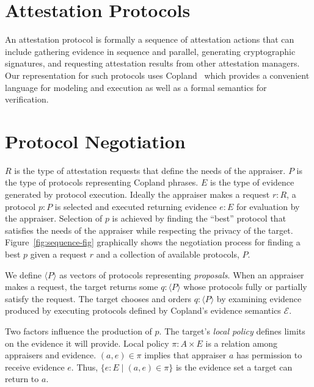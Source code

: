 \documentclass[sigconf,authordraft]{acmart}
\begin{document}
\section{Attestation Protocols}

An attestation protocol is formally a sequence of attestation actions
that can include gathering evidence in sequence and parallel,
generating cryptographic signatures, and requesting attestation
results from other attestation managers.  Our representation for such
protocols uses Copland~\citep{Ramsdell:2019aa} which provides a
convenient language for modeling and execution as well as a formal
semantics for verification.


\section{Protocol Negotiation}

$R$ is the type of attestation requests that define the needs of the
appraiser.  $P$ is the type of protocols representing Copland phrases.
$E$ is the type of evidence generated by protocol execution.  Ideally
the appraiser makes a request $r:R$, a protocol $p:P$ is selected and
executed returning evidence $e:E$ for evaluation by the appraiser.
Selection of $p$ is achieved by finding the ``best'' protocol that
satisfies the needs of the appraiser while respecting the privacy of
the target.  Figure~\ref{fig:sequence-fig} graphically shows the
negotiation process for finding a best $p$ given a request $r$ and a
collection of available protocols, $P$.

We define $\langle P \rangle$ as vectors of protocols
representing \emph{proposals}.  When an appraiser makes a request,
the target returns some $q:\langle P \rangle$ whose protocols fully or
partially satisfy the request. The target chooses and orders
$q:\langle P\rangle$ by examining evidence produced by executing
protocols defined by Copland's evidence semantics $\mathcal{E}$.

Two factors influence the production of $p$.  The target's \emph{local
policy} defines limits on the evidence it will provide.  Local policy 
$\pi : A\times E$ is a relation among appraisers and evidence.
$(a,e)\in\pi$ implies that appraiser $a$ has permission to receive
evidence $e$.  Thus, $\{e:E\mid (a,e)\in\pi\}$ is the evidence set a target
can return to $a$.
\end{document}
